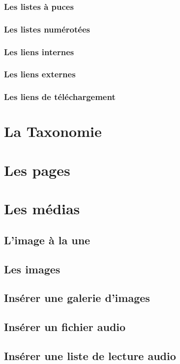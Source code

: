 \documentclass[10pt,a4paper]{article}
\begin{document}
\subsubsection{Les listes à puces}
\subsubsection{Les listes numérotées}
\subsubsection{Les liens internes}
\subsubsection{Les liens externes}
\subsubsection{Les liens de téléchargement}
\newpage

\section{La Taxonomie}
\newpage

\section{Les pages}
\newpage

\section{Les médias}
\subsection{L'image à la une}
\newpage
\subsection{Les images}
\newpage
\subsection{Insérer une galerie d'images}
\newpage
\subsection{Insérer un fichier audio}
\newpage
\subsection{Insérer une liste de lecture audio}
\newpage
\end{document}
